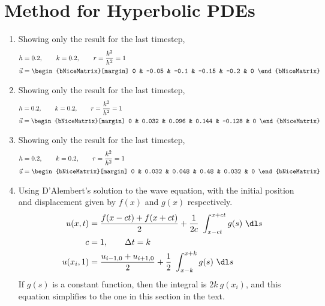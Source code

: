 \section{Method for Hyperbolic PDEs}

\begin{enumerate}
    \item Showing only the result for the last timestep,
          \begin{align}
              h       & = 0.2, \qquad k = 0.2, \qquad
              r = \frac{k^2}{h^2} = 1                         \\
              \vec{u} & = \begin{bNiceMatrix}[margin]
                              0 & -0.05 & -0.1 & -0.15 & -0.2 & 0
                          \end{bNiceMatrix}
          \end{align}

    \item Showing only the result for the last timestep,
          \begin{align}
              h       & = 0.2, \qquad k = 0.2, \qquad
              r = \frac{k^2}{h^2} = 1                            \\
              \vec{u} & = \begin{bNiceMatrix}[margin]
                              0 & 0.032 & 0.096 & 0.144 & -0.128 & 0
                          \end{bNiceMatrix}
          \end{align}

    \item Showing only the result for the last timestep,
          \begin{align}
              h       & = 0.2, \qquad k = 0.2, \qquad
              r = \frac{k^2}{h^2} = 1                          \\
              \vec{u} & = \begin{bNiceMatrix}[margin]
                              0 & 0.032 & 0.048 & 0.48 & 0.032 & 0
                          \end{bNiceMatrix}
          \end{align}

    \item Using D'Alembert's solution to the wave equation, with the initial position and
          displacement given by $ f(x) $ and $ g(x) $ respectively.
          \begin{align}
              u(x, t)   & = \frac{f(x-ct) + f(x+ct)}{2} + \frac{1}{2c}
              \ \int_{x-ct}^{x+ct} g(s)\ \dl s                         \\
              c         & = 1, \qquad \Delta t = k                     \\
              u(x_i, 1) & = \frac{u_{i-1,0} + u_{i+1,0}}{2}
              + \frac{1}{2}\ \int_{x-k}^{x+k} g(s)\ \dl s
          \end{align}
          If $ g(s) $ is a constant function, then the integral is $ 2k\ g(x_i) $, and
          this equation simplifies to the one in this section in the text.


\end{enumerate}
